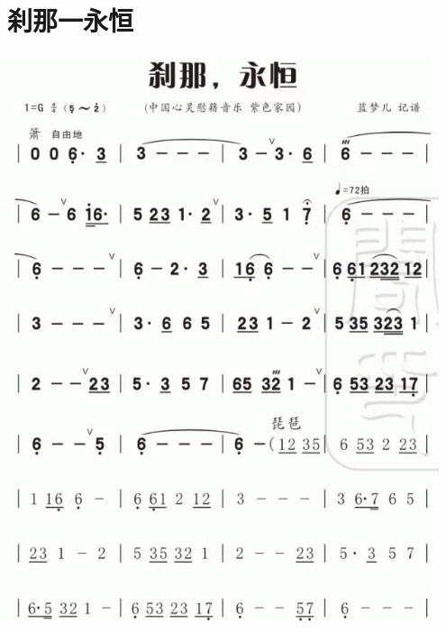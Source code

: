 \documentclass[cn,pad,twocol]{elegantbook}
\begin{document}
\section{刹那一永恒}\includegraphics[width=0.95\textwidth]{dongxiao/20200819/刹那-永恒.png}
\end{document}
